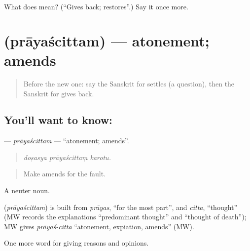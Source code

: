 \begin{tcolorbox}[breakable,colback=teal!4,colframe=teal!35!black,title={Before you move on}]
What does  mean? (\textquotedblleft{}Gives back; restores\textquotedblright{}.) Say it once more.
\end{tcolorbox}
\section[\texorpdfstring{\sk{प्रायश्चित्तम्} (prāyaścittam)}{प्रायश्चित्तम् (prāyaścittam)}]{ (prāyaścittam) — atonement; amends}

\label{lesson:SA-C350-prayascittam}



\begin{quote}
Before the new one: say the Sanskrit for settles (a question), then the Sanskrit for gives back.
\end{quote}

\subsection*{You'll want to know: }
\textbf{} — \emph{prāyaścittam} — \textquotedblleft{}atonement; amends\textquotedblright{}.

\begin{quote}
  
\end{quote}

\begin{quote}
\emph{doṣasya prāyaścittaṃ karotu.}
\end{quote}

\begin{quote}
Make amends for the fault.
\end{quote}

A neuter noun.

\begin{cousinweb}
\textbf{} (\emph{prāyaścittam}) is built from \emph{prāyas}, \textquotedblleft{}for the most part\textquotedblright{}, and \emph{citta}, \textquotedblleft{}thought\textquotedblright{} (MW records the explanations \textquotedblleft{}predominant thought\textquotedblright{} and \textquotedblleft{}thought of death\textquotedblright{}); MW gives \emph{prāyaś-citta} \textquotedblleft{}atonement, expiation, amends\textquotedblright{} (MW).
\end{cousinweb}

\begin{grammarlens}[title={What you've built}]
One more word for giving reasons and opinions.
\end{grammarlens}

